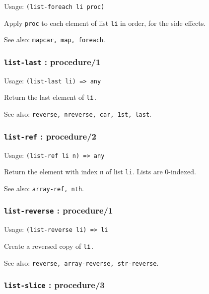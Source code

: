\documentclass[
]{article}
\newcommand{\passthrough}[1]{#1}
\begin{document}
Usage: \passthrough{\lstinline!(list-foreach li proc)!}

Apply \passthrough{\lstinline!proc!} to each element of list
\passthrough{\lstinline!li!} in order, for the side effects.

See also: \passthrough{\lstinline!mapcar, map, foreach!}.

\hypertarget{list-last-procedure1}{%
\subsubsection{\texorpdfstring{\texttt{list-last} :
procedure/1}{list-last : procedure/1}}\label{list-last-procedure1}}

Usage: \passthrough{\lstinline!(list-last li) => any!}

Return the last element of \passthrough{\lstinline!li.!}

See also: \passthrough{\lstinline!reverse, nreverse, car, 1st, last!}.

\hypertarget{list-ref-procedure2}{%
\subsubsection{\texorpdfstring{\texttt{list-ref} :
procedure/2}{list-ref : procedure/2}}\label{list-ref-procedure2}}

Usage: \passthrough{\lstinline!(list-ref li n) => any!}

Return the element with index \passthrough{\lstinline!n!} of list
\passthrough{\lstinline!li!}. Lists are 0-indexed.

See also: \passthrough{\lstinline!array-ref, nth!}.

\hypertarget{list-reverse-procedure1}{%
\subsubsection{\texorpdfstring{\texttt{list-reverse} :
procedure/1}{list-reverse : procedure/1}}\label{list-reverse-procedure1}}

Usage: \passthrough{\lstinline!(list-reverse li) => li!}

Create a reversed copy of \passthrough{\lstinline!li.!}

See also: \passthrough{\lstinline!reverse, array-reverse, str-reverse!}.

\hypertarget{list-slice-procedure3}{%
\subsubsection{\texorpdfstring{\texttt{list-slice} :
procedure/3}{list-slice : procedure/3}}\label{list-slice-procedure3}}
\end{document}
